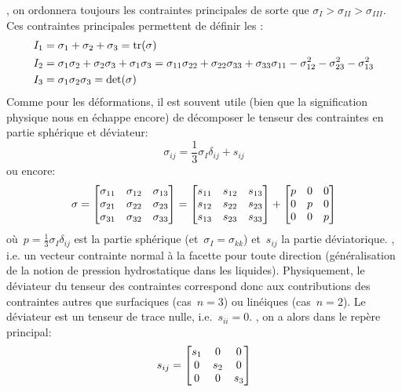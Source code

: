 , on ordonnera toujours les contraintes principales de sorte que
$\sigma_I > \sigma_{II} > \sigma_{III}$.
\medskipvm
Ces contraintes principales permettent de définir les :
\begin{align}
I_1 &= \sigma_1 + \sigma_2 + \sigma_3 = \operatorname{tr}(\sigma) \\
I_2 &= \sigma_1 \sigma_2 + \sigma_2 \sigma_3 + \sigma_1 \sigma_3= \sigma_{11}\sigma_{22} + \sigma_{22}\sigma_{33} + \sigma_{33}\sigma_{11} -\sigma_{12}^2 - \sigma_{23}^2 - \sigma_{13}^2\\ I_3 &= \sigma_1 \sigma_2 \sigma_3 = \det(\sigma) 
\end{align}
\medskipvm
Comme pour les déformations, il est souvent utile (bien que la signification physique nous en échappe
encore) de décomposer le tenseur des contraintes en partie sphérique et déviateur:
\begin{equation} \sigma_{ij} = \frac13\sigma_I\delta_{ij}+s_{ij}
\end{equation}
ou encore:
\begin{equation}
\sigma =
\MM*{\sigma_{11}&\sigma_{12}&\sigma_{13}\\ \sigma_{21}&\sigma_{22}&\sigma_{23}\\
\sigma_{31}&\sigma_{32}&\sigma_{33}}
=
\MM*{s_{11}&s_{12}&s_{13}\\ s_{12}&s_{22}&s_{23}\\
s_{13}&s_{23}&s_{33}}
+\MM*{p&0&0\\0&p&0\\0&0&p}
\end{equation}
où~$p=\frac13\sigma_I\delta_{ij}$ est la partie sphérique (et~$\sigma_I=\sigma_{kk}$)
et~$s_{ij}$ la partie déviatorique.
\medskipvm
{}, i.e. un vecteur
contrainte normal à la facette pour toute direction (généralisation de la notion de pression
hydrostatique dans les liquides).
\medskipvm
Physiquement, le déviateur du tenseur des contraintes correspond donc aux contributions des
contraintes autres que surfaciques (cas~$n = 3$) ou linéiques (cas~$n = 2$).
Le déviateur est un tenseur de trace nulle, i.e.~$s_{ii}=0$.
\medskipvm
{},
on a alors dans le repère principal:
\begin{equation}
s_{ij} = \MM*{s_{1} & 0 & 0 \\ 0 & s_{2} & 0 \\ 0 & 0 & s_{3}} 
\end{equation}

